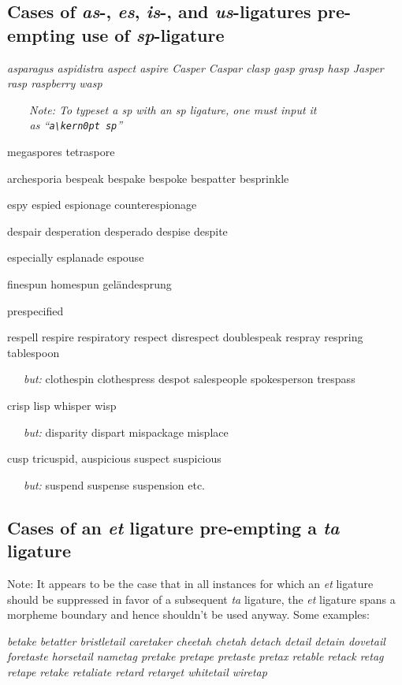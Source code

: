 \subsection*{Cases of \emph{as}-, {\em\ebg es}, \emph{is}-, and \emph{us}-ligatures pre-empting use of  \emph{sp}-ligature}

\bgroup \em
asparagus aspidistra aspect aspire Casper Caspar clasp gasp grasp hasp Jasper rasp raspberry wasp 

\ \ \ \ {\em Note: To typeset \emph{a\kern0pt sp} with an \emph{sp} ligature, one must input it \\
\ \ \ \ as ``\texttt{a\textbackslash kern0pt sp}''}

megaspores tetraspore

{\ebg
archesporia bespeak bespake bespoke bespatter besprinkle

espy espied espionage counterespionage

despair desperation desperado
despise despite

especially
esplanade
espouse

finespun homespun
geländesprung

prespecified

respell respire respiratory 
respect disrespect
doublespeak
respray respring 
tablespoon


\ \  \ \emph{but:} clothespin clothespress despot salespeople spokesperson trespass 
}

crisp lisp whisper wisp

\ \ \ \emph{but:} disparity dispart mispackage misplace

cusp tricuspid, auspicious suspect suspicious 

\ \ \ \emph{but:} suspend suspense suspension etc.

\egroup



\subsection*{Cases of an \emph{et} ligature pre-empting a \emph{ta} ligature}

Note: It appears to be the case that in all instances for which an \emph{et} ligature should be suppressed in favor of a subsequent \emph{ta} ligature, the \emph{et} ligature spans a morpheme boundary and hence shouldn't be used anyway. Some examples:

\bgroup \em
betake betatter bristletail caretaker cheetah chetah
detach detail detain dovetail 
foretaste horsetail nametag pretake
pretape pretaste pretax retable retack
retag retape retake retaliate retard retarget
whitetail wiretap

